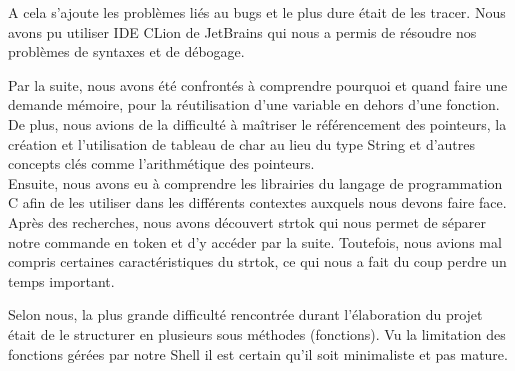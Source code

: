 \documentclass[12pt]{article}
\begin{document}
A cela s’ajoute les problèmes liés au bugs et le plus dure était de les tracer. Nous avons pu utiliser IDE CLion de JetBrains qui nous a permis de résoudre nos problèmes de syntaxes et de débogage.

Par la suite, nous avons été confrontés à comprendre pourquoi et quand faire une demande mémoire, pour la réutilisation d’une variable en dehors d’une fonction. De plus, nous avions de la difficulté à maîtriser le référencement des pointeurs, la création et l’utilisation de tableau de char au lieu du type String et d’autres concepts clés comme l’arithmétique des pointeurs.\\

 Ensuite, nous avons eu à comprendre les librairies du langage de programmation C afin de les utiliser dans les différents contextes auxquels nous devons faire face. Après des recherches, nous avons découvert strtok qui nous permet de séparer notre commande en token et d’y accéder par la suite. Toutefois, nous avions mal compris certaines caractéristiques du strtok, ce qui nous a fait du coup perdre un temps important.
 
Selon nous, la plus grande difficulté rencontrée durant l’élaboration du projet était de le structurer en plusieurs sous méthodes (fonctions). Vu la limitation des fonctions gérées par notre Shell il est certain qu’il soit minimaliste et pas mature.\\
\end{document}
